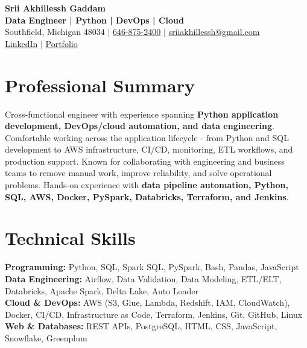 \documentclass[letterpaper,10pt]{article}
\begin{document}
\fontsize{9.35pt}{10.45pt}\selectfont

\begin{center}
    {\LARGE \textbf{Srii Akhillessh Gaddam}} \\[-1pt]
    \textbf{Data Engineer | Python | DevOps | Cloud} \\[2pt]
    Southfield, Michigan 48034 $|$
    \href{tel:6468752400}{646-875-2400} $|$
    \href{mailto:sriiakhillessh@gmail.com}{sriiakhillessh@gmail.com} \\[1pt]
    \href{https://www.linkedin.com/in/srii-akhiilessh-gaddam-b48668191/}{LinkedIn} $|$
    \href{https://sriiakhillesshg.github.io/portfolio/}{Portfolio}
\end{center}
\vspace{-8pt}

\section{Professional Summary}
\small{Cross-functional engineer with experience spanning \textbf{Python application development, DevOps/cloud automation, and data engineering}. Comfortable working across the application lifecycle - from Python and SQL development to AWS infrastructure, CI/CD, monitoring, ETL workflows, and production support. Known for collaborating with engineering and business teams to remove manual work, improve reliability, and solve operational problems. Hands-on experience with \textbf{data pipeline automation, Python, SQL, AWS, Docker, PySpark, Databricks, Terraform, and Jenkins}.}

\section{Technical Skills}
\small{
\textbf{Programming:} Python, SQL, Spark SQL, PySpark, Bash, Pandas, JavaScript \\
\textbf{Data Engineering:} Airflow, Data Validation, Data Modeling, ETL/ELT, Databricks, Apache Spark, Delta Lake, Auto Loader \\
\textbf{Cloud \& DevOps:} AWS (S3, Glue, Lambda, Redshift, IAM, CloudWatch), Docker, CI/CD, Infrastructure as Code, Terraform, Jenkins, Git, GitHub, Linux \\
\textbf{Web \& Databases:} REST APIs, PostgreSQL, HTML, CSS, JavaScript, Snowflake, Greenplum
}
\end{document}
